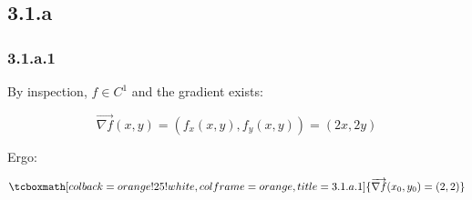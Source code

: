 \documentclass{article}
\begin{document}
\subsection*{3.1.a}
\label{subsec:3.1.a}

\subsubsection*{3.1.a.1}
\label{subsubsec:3.1.a.1}

By inspection, $f \in C^1$ and the gradient exists:

\begin{equation}
\overrightarrow{ \nabla f }(x,y) = (f_x(x,y), f_y(x,y)) = (2x, 2y)
\end{equation}

Ergo:

\begin{equation}
\tcboxmath[colback=orange!25!white,colframe=orange,title=3.1.a.1]
{
\overrightarrow{ \nabla f }(x_0,y_0) = (2, 2)
}
\end{equation}
\end{document}
